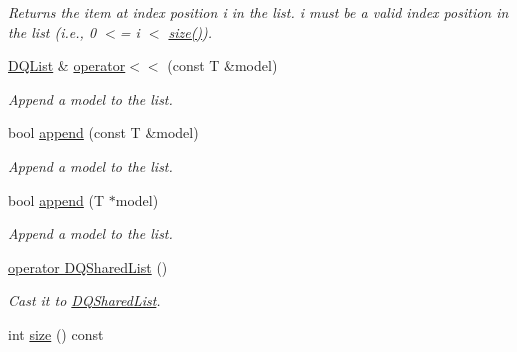 \begin{DoxyCompactItemize}
\begin{DoxyCompactList}\small\item\em Returns the item at index position i in the list. i must be a valid index position in the list (i.e., 0 $<$= i $<$ \hyperlink{classDQSharedList_a7686c471ce10b212b120ac2676d466e8}{size()}). \item\end{DoxyCompactList}\item 
\hyperlink{classDQList}{DQList} \& \hyperlink{classDQList_a4cc671ee41ab64300f482fd7ad7ff1e6}{operator$<$$<$} (const T \&model)
\begin{DoxyCompactList}\small\item\em Append a model to the list. \item\end{DoxyCompactList}\item 
bool \hyperlink{classDQList_a36085b2895e1acb9256758e86bc97c6e}{append} (const T \&model)
\begin{DoxyCompactList}\small\item\em Append a model to the list. \item\end{DoxyCompactList}\item 
bool \hyperlink{classDQList_a0839648e6122dcbfe6c1d4423e5ade10}{append} (T $\ast$model)
\begin{DoxyCompactList}\small\item\em Append a model to the list. \item\end{DoxyCompactList}\item 
\hypertarget{classDQList_aad18e286ae82c76362d445a965d6854a}{
\hyperlink{classDQList_aad18e286ae82c76362d445a965d6854a}{operator DQSharedList} ()}
\label{classDQList_aad18e286ae82c76362d445a965d6854a}

\begin{DoxyCompactList}\small\item\em Cast it to \hyperlink{classDQSharedList}{DQSharedList}. \item\end{DoxyCompactList}\item 
\hypertarget{classDQSharedList_a7686c471ce10b212b120ac2676d466e8}{
int \hyperlink{classDQSharedList_a7686c471ce10b212b120ac2676d466e8}{size} () const }
\label{classDQSharedList_a7686c471ce10b212b120ac2676d466e8}


\end{DoxyCompactItemize}
